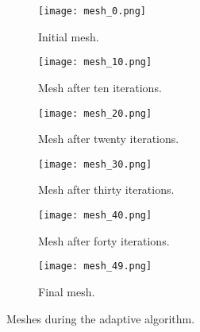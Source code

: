 \begin{figure}[htbp]
    \begin{subfigure}[t]{0.49\textwidth}
        \centering
        \texttt{[image: mesh\_0.png]}
        \caption{Initial mesh.}
        \label{fig:mesh_0}
    \end{subfigure}
    \begin{subfigure}[t]{0.49\textwidth}
        \centering
        \texttt{[image: mesh\_10.png]}
        \caption{Mesh after ten iterations.}
        \label{fig:mesh_10}
    \end{subfigure}
    \vspace{1cm}
    \begin{subfigure}[t]{0.49\textwidth}
        \centering
        \texttt{[image: mesh\_20.png]}
        \caption{Mesh after twenty iterations.}
        \label{fig:mesh_20}
    \end{subfigure}
    \begin{subfigure}[t]{0.49\textwidth}
        \centering
        \texttt{[image: mesh\_30.png]}
        \caption{Mesh after thirty iterations.}
        \label{fig:mesh_30}
    \end{subfigure}
    \vspace{1cm}
    \begin{subfigure}[t]{0.49\textwidth}
        \centering
        \texttt{[image: mesh\_40.png]}
        \caption{Mesh after forty iterations.}
        \label{fig:mesh_40}
    \end{subfigure}
    \begin{subfigure}[t]{0.49\textwidth}
        \centering
        \texttt{[image: mesh\_49.png]}
        \caption{Final mesh.}
        \label{fig:mesh_50}
    \end{subfigure}
    \caption{Meshes during the adaptive algorithm.}
\end{figure}

